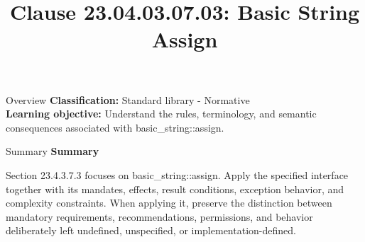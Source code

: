 \documentclass[10pt,letterpaper]{article}
\title{Clause 23.04.03.07.03: Basic String Assign}
\author{}
\date{}
\begin{document}
\maketitle
\begin{CornellOverviewBox}{Overview}
\textbf{Classification:} Standard library - Normative\\[2pt]
\textbf{Learning objective:} Understand the rules, terminology, and semantic consequences associated with basic\_string::assign.
\end{CornellOverviewBox}\begin{CornellSummaryBox}{Summary}
{\sffamily\bfseries\color{Accent} Summary}\par\vspace{3pt}Section 23.4.3.7.3 focuses on basic\_string::assign. Apply the specified interface together with its mandates, effects, result conditions, exception behavior, and complexity constraints. When applying it, preserve the distinction between mandatory requirements, recommendations, permissions, and behavior deliberately left undefined, unspecified, or implementation-defined.
\end{CornellSummaryBox}
\end{document}
